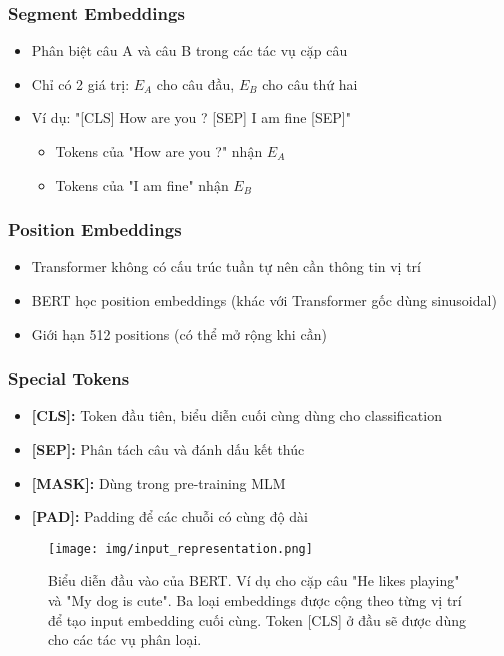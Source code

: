 \subsubsection{Segment Embeddings}  
\begin{itemize}
    \item Phân biệt câu A và câu B trong các tác vụ cặp câu
    \item Chỉ có 2 giá trị: $E_A$ cho câu đầu, $E_B$ cho câu thứ hai
    \item Ví dụ: "[CLS] How are you ? [SEP] I am fine [SEP]"
    \begin{itemize}
        \item Tokens của "How are you ?" nhận $E_A$
        \item Tokens của "I am fine" nhận $E_B$
    \end{itemize}
\end{itemize}

\subsubsection{Position Embeddings}
\begin{itemize}
    \item Transformer không có cấu trúc tuần tự nên cần thông tin vị trí
    \item BERT học position embeddings (khác với Transformer gốc dùng sinusoidal)
    \item Giới hạn 512 positions (có thể mở rộng khi cần)
\end{itemize}

\subsubsection{Special Tokens}
\begin{itemize}
    \item \textbf{[CLS]:} Token đầu tiên, biểu diễn cuối cùng dùng cho classification
    \item \textbf{[SEP]:} Phân tách câu và đánh dấu kết thúc
    \item \textbf{[MASK]:} Dùng trong pre-training MLM
    \item \textbf{[PAD]:} Padding để các chuỗi có cùng độ dài
\end{itemize}

\begin{figure}[H]
    \centering
    \texttt{[image: img/input\_representation.png]}
    \caption{Biểu diễn đầu vào của BERT. Ví dụ cho cặp câu "He likes playing" và "My dog is cute". Ba loại embeddings được cộng theo từng vị trí để tạo input embedding cuối cùng. Token [CLS] ở đầu sẽ được dùng cho các tác vụ phân loại.}
    \label{fig:bert_input_representation}
\end{figure}

